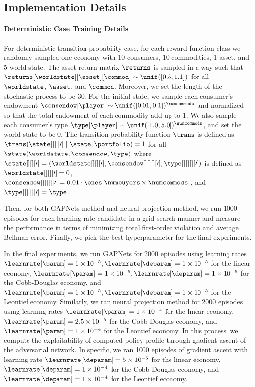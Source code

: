 \subsection{Implementation Details}
\paragraph{Deterministic Case Training Details}
For deterministic transition probability case, for each reward function class
we randomly sampled one economy with 10 consumers, 10 commodities, 1 asset, and 5 world state. The asset return matrix $\returns$
is sampled in a way such that $\returns[\worldstate][\asset][\commod]\sim \unif([0.5, 1.1])$ for all $\worldstate$, $\asset$, and $\commod$. Moreover, we set the length of the stochastic process to be 30.
For the initial state, we sample each consumer's endowment $\consendow[\player]\sim \unif([0.01, 0.1])^\numcommods$ and normalized so that the total endowment of each commodity add up to 1. We also sample each consumer's type $\type[\player]\sim \unif([1.0, 5.0])^\numcommods$, and set the world state to be 0. 
The transition probability function $\trans$ is defined as $\trans(\state[][][\prime]\mid \state, \portfolio)=1$ for all $\state(\worldstate, \consendow, \type)$ where $\state[][][\prime]=(\worldstate[][][\prime], \consendow[][][][\prime], \type[][][][\prime])$ is defined as $\worldstate[][][\prime]=0$, $\consendow[][][][\prime]=0.01\cdot\ones[\numbuyers\times \numcommods]$, and $\type[][][][\prime]=\type$. 

Then, for both GAPNets method and neural projection method, we run 1000 episodes for each learning rate candidate in a grid search manner and measure the performance in terms of minimizing total first-order violation and average Bellman error. Finally, we pick the best hyperparameter for the final experiments. 

In the final experiments, we run GAPNets for 2000 episodes using learning rates $\learnrate[\param]=1\times 10^{-5}, \learnrate[\deparam]=1\times 10^{-5}$ for the linear economy, 
$\learnrate[\param]=1\times 10^{-5}, \learnrate[\deparam]=1\times 10^{-5}$ for the Cobb-Douglas economy, 
and $\learnrate[\param]=1\times 10^{-5}, \learnrate[\deparam]=1\times 10^{-5}$ for the Leontief economy. 
Similarly, we ran neural projection method for 2000 episodes using learning rates
$\learnrate[\param]=1\times 10^{-4}$ for the linear economy,
$\learnrate[\param]=2.5\times 10^{-5}$ for the Cobb-Douglas economy,
and $\learnrate[\param]=1\times 10^{-4}$ for the Leontief economy.
In this process, we compute the exploitability of computed policy profile through gradient ascent of the adversarial network. In specific, we ran 1000 episodes of gradient ascent with learning rate $\learnrate[\deparam]=5\times 10^{-5}$ for the linear economy, 
$\learnrate[\deparam]=1\times 10^{-4}$ for the Cobb-Douglas economy, 
and $\learnrate[\deparam]=1\times 10^{-4}$ for the Leontief economy. 

